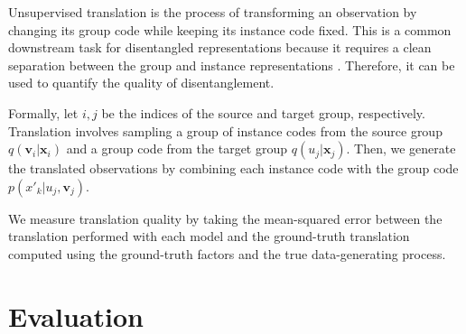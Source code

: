 \documentclass[nohyperref]{article}
\theoremstyle{plain}
\theoremstyle{definition}
\theoremstyle{remark}
\begin{document}
Unsupervised translation is the process of transforming an observation by changing its group code while keeping its instance code fixed. This is a common downstream task for disentangled representations because it requires a clean separation between the group and instance representations \citep{Tenenbaum2000SeparatingSA}. Therefore, it can be used to quantify the quality of disentanglement.

Formally, let $i, j$ be the indices of the source and target group, respectively. Translation involves sampling a group of instance codes from the source group $q(\mathbf{v}_i | \mathbf{x}_i)$ and a group code from the target group $q(u_j | \mathbf{x}_j)$. Then, we generate the translated observations by combining each instance code with the group code $p(x'_{k} | u_j, \mathbf{v}_j)$.

We measure translation quality by taking the mean-squared error between the translation performed with each model and the ground-truth translation computed using the ground-truth factors and the true data-generating process.

\section{Evaluation}
\end{document}
